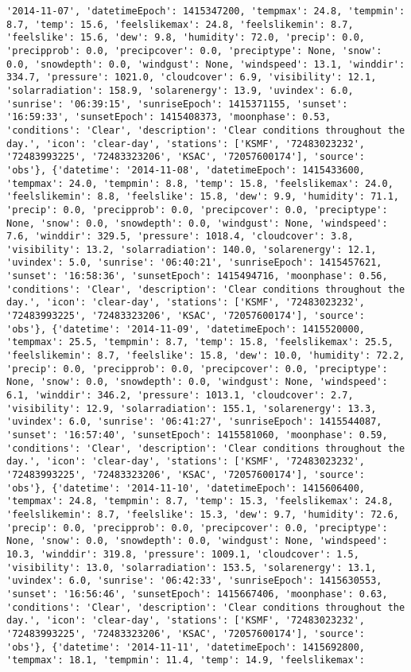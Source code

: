\documentclass[
  letterpaper,
  DIV=11,
  numbers=noendperiod]{scrartcl}
\begin{document}
\begin{verbatim}
'2014-11-07', 'datetimeEpoch': 1415347200, 'tempmax': 24.8, 'tempmin': 8.7, 'temp': 15.6, 'feelslikemax': 24.8, 'feelslikemin': 8.7, 'feelslike': 15.6, 'dew': 9.8, 'humidity': 72.0, 'precip': 0.0, 'precipprob': 0.0, 'precipcover': 0.0, 'preciptype': None, 'snow': 0.0, 'snowdepth': 0.0, 'windgust': None, 'windspeed': 13.1, 'winddir': 334.7, 'pressure': 1021.0, 'cloudcover': 6.9, 'visibility': 12.1, 'solarradiation': 158.9, 'solarenergy': 13.9, 'uvindex': 6.0, 'sunrise': '06:39:15', 'sunriseEpoch': 1415371155, 'sunset': '16:59:33', 'sunsetEpoch': 1415408373, 'moonphase': 0.53, 'conditions': 'Clear', 'description': 'Clear conditions throughout the day.', 'icon': 'clear-day', 'stations': ['KSMF', '72483023232', '72483993225', '72483323206', 'KSAC', '72057600174'], 'source': 'obs'}, {'datetime': '2014-11-08', 'datetimeEpoch': 1415433600, 'tempmax': 24.0, 'tempmin': 8.8, 'temp': 15.8, 'feelslikemax': 24.0, 'feelslikemin': 8.8, 'feelslike': 15.8, 'dew': 9.9, 'humidity': 71.1, 'precip': 0.0, 'precipprob': 0.0, 'precipcover': 0.0, 'preciptype': None, 'snow': 0.0, 'snowdepth': 0.0, 'windgust': None, 'windspeed': 7.6, 'winddir': 329.5, 'pressure': 1018.4, 'cloudcover': 3.8, 'visibility': 13.2, 'solarradiation': 140.0, 'solarenergy': 12.1, 'uvindex': 5.0, 'sunrise': '06:40:21', 'sunriseEpoch': 1415457621, 'sunset': '16:58:36', 'sunsetEpoch': 1415494716, 'moonphase': 0.56, 'conditions': 'Clear', 'description': 'Clear conditions throughout the day.', 'icon': 'clear-day', 'stations': ['KSMF', '72483023232', '72483993225', '72483323206', 'KSAC', '72057600174'], 'source': 'obs'}, {'datetime': '2014-11-09', 'datetimeEpoch': 1415520000, 'tempmax': 25.5, 'tempmin': 8.7, 'temp': 15.8, 'feelslikemax': 25.5, 'feelslikemin': 8.7, 'feelslike': 15.8, 'dew': 10.0, 'humidity': 72.2, 'precip': 0.0, 'precipprob': 0.0, 'precipcover': 0.0, 'preciptype': None, 'snow': 0.0, 'snowdepth': 0.0, 'windgust': None, 'windspeed': 6.1, 'winddir': 346.2, 'pressure': 1013.1, 'cloudcover': 2.7, 'visibility': 12.9, 'solarradiation': 155.1, 'solarenergy': 13.3, 'uvindex': 6.0, 'sunrise': '06:41:27', 'sunriseEpoch': 1415544087, 'sunset': '16:57:40', 'sunsetEpoch': 1415581060, 'moonphase': 0.59, 'conditions': 'Clear', 'description': 'Clear conditions throughout the day.', 'icon': 'clear-day', 'stations': ['KSMF', '72483023232', '72483993225', '72483323206', 'KSAC', '72057600174'], 'source': 'obs'}, {'datetime': '2014-11-10', 'datetimeEpoch': 1415606400, 'tempmax': 24.8, 'tempmin': 8.7, 'temp': 15.3, 'feelslikemax': 24.8, 'feelslikemin': 8.7, 'feelslike': 15.3, 'dew': 9.7, 'humidity': 72.6, 'precip': 0.0, 'precipprob': 0.0, 'precipcover': 0.0, 'preciptype': None, 'snow': 0.0, 'snowdepth': 0.0, 'windgust': None, 'windspeed': 10.3, 'winddir': 319.8, 'pressure': 1009.1, 'cloudcover': 1.5, 'visibility': 13.0, 'solarradiation': 153.5, 'solarenergy': 13.1, 'uvindex': 6.0, 'sunrise': '06:42:33', 'sunriseEpoch': 1415630553, 'sunset': '16:56:46', 'sunsetEpoch': 1415667406, 'moonphase': 0.63, 'conditions': 'Clear', 'description': 'Clear conditions throughout the day.', 'icon': 'clear-day', 'stations': ['KSMF', '72483023232', '72483993225', '72483323206', 'KSAC', '72057600174'], 'source': 'obs'}, {'datetime': '2014-11-11', 'datetimeEpoch': 1415692800, 'tempmax': 18.1, 'tempmin': 11.4, 'temp': 14.9, 'feelslikemax': 
\end{verbatim}
\end{document}
